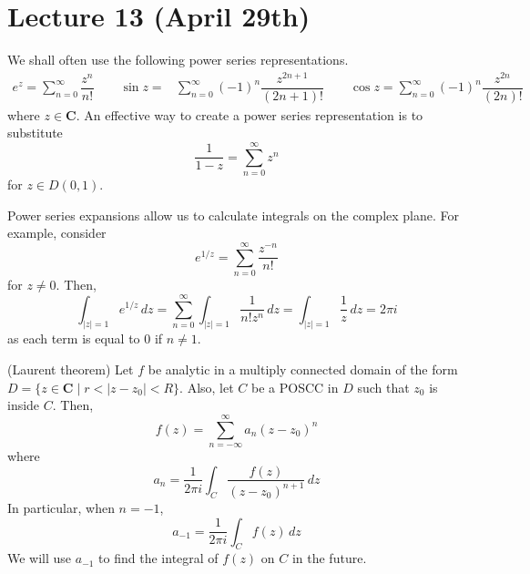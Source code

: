 \section{Lecture 13 (April 29th)}
\begin{prop}
We shall often use the following power series representations.
\begin{align*}
e^z=\sum ^{\infty }_{n=0}\dfrac{z^{n}}{n!}\qquad
\sin z=&\sum ^{\infty }_{n=0}(-1)^{n}\dfrac{z^{2n+1}}{(2n+1)!}\qquad 
\cos z=\sum ^{\infty }_{n=0}(-1)^{n}\dfrac{z^{2n}}{(2n)!}
\end{align*}
where $z\in {\bm C}$. An effective way to create a power series representation is to substitute 
\[\dfrac{1}{1-z}=\sum ^{\infty }_{n=0}z^{n}\]
for $z\in D(0,1)$. 
\end{prop}
\vspace{2ex}
\begin{ex}
Power series expansions allow us to calculate integrals on the complex plane. For example, consider
\[e^{1/z}=\sum ^{\infty }_{n=0}\dfrac{z^{-n}}{n!}\]
for $z\ne 0$. Then, 
\[\int _{|z|=1}e^{1/z}\,dz=\sum ^{\infty }_{n=0}\int _{|z|=1}\dfrac{1}{n!z^{n}}\,dz=\int _{|z|=1}\dfrac{1}{z}\,dz=2\pi i\]
as each term is equal to 0 if $n\ne 1$.
\end{ex}
\vspace{2ex}
\begin{thm}
(Laurent theorem) Let $f$ be analytic in a multiply connected domain of the form $D=\{z\in {\bm C} \;|\; r<|z-z_0|<R\}$. Also, let $C$ be a POSCC in $D$ such that $z_0$ is inside $C$. Then,
\[f(z)=\sum ^{\infty }_{n=-\infty }a_{n}(z-z_0)^{n}\]
where 
\[a_{n}=\dfrac{1}{2\pi i}\int _{C}\dfrac{f(z)}{(z-z_0)^{n+1}}\,dz\]
In particular, when $n=-1$,
\[a_{-1}=\dfrac{1}{2\pi i}\int _{C}f(z)\,dz\]
We will use $a_{-1}$ to find the integral of $f(z)$ on $C$ in the future. 
\end{thm}
\vspace{2ex}
